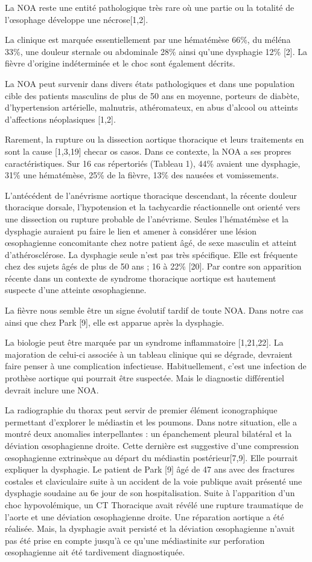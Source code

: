 \documentclass[./tfe.tex]{subfiles}
\begin{document}
La NOA reste une entité pathologique très rare où une partie ou la totalité de l’œsophage développe une nécrose[1,2].

La clinique est marquée essentiellement par une hématémèse 66\%, du méléna 33\%, une douleur sternale ou abdominale 28\% ainsi qu’une dysphagie 12\% [2]. La fièvre d'origine indéterminée et le choc sont également décrits.

La NOA peut survenir dans divers états pathologiques et dans une population cible des patients masculins de plus de 50 ans en moyenne, porteurs de diabète, d’hypertension artérielle, malnutris, athéromateux, en abus d’alcool ou atteints d’affections néoplasiques [1,2].

Rarement, la rupture ou la dissection aortique thoracique et leurs traitements en sont la cause [1,3,19]  checar os casos.
Dans ce contexte, la NOA a ses propres caractéristiques. Sur 16 cas répertoriés (Tableau 1), 44\% avaient une dysphagie, 31\% une hématémèse, 25\% de la fièvre, 13\% des nausées et vomissements.

L’antécédent de l’anévrisme aortique thoracique descendant, la récente douleur thoracique dorsale, l’hypotension et la tachycardie réactionnelle ont orienté vers une dissection ou rupture probable de l’anévrisme. Seules l’hématémèse et la dysphagie auraient pu faire le lien et amener à considérer une lésion œsophagienne concomitante chez notre patient âgé, de sexe masculin et atteint d’athérosclérose. La dysphagie seule n’est pas très spécifique. Elle est fréquente chez des sujets âgés de plus de 50 ans ; 16 à 22\% [20]. Par contre son apparition récente dans un contexte de syndrome thoracique aortique est hautement suspecte d’une atteinte œsophagienne.

La fièvre nous semble être un signe évolutif tardif de toute NOA. Dans notre cas ainsi que chez Park [9], elle est apparue après la dysphagie.

La biologie peut être marquée par un syndrome inflammatoire [1,21,22]. La majoration de celui-ci associée à un tableau clinique qui se dégrade, devraient faire penser à une complication infectieuse. Habituellement, c’est une infection de prothèse aortique qui pourrait être suspectée. Mais le diagnostic différentiel devrait inclure une NOA.

La radiographie du thorax peut servir de premier élément iconographique permettant d’explorer le médiastin et les poumons. Dans notre situation, elle a montré deux anomalies interpellantes : un épanchement pleural bilatéral et la déviation œsophagienne droite. Cette dernière est suggestive d’une compression œsophagienne extrinsèque au départ du médiastin postérieur[7,9]. Elle pourrait expliquer la dysphagie. Le patient de Park [9] âgé de 47 ans avec des fractures costales et claviculaire suite à un accident de la voie publique avait présenté une dysphagie soudaine au 6e jour de son hospitalisation. Suite à l’apparition d’un choc hypovolémique, un CT Thoracique avait révélé une rupture traumatique de l’aorte et une déviation œsophagienne droite. Une réparation aortique a été réalisée. Mais, la dysphagie avait persisté et la déviation œsophagienne n’avait pas été prise en compte jusqu’à ce qu’une médiastinite sur perforation œsophagienne ait été tardivement diagnostiquée.
\end{document}
